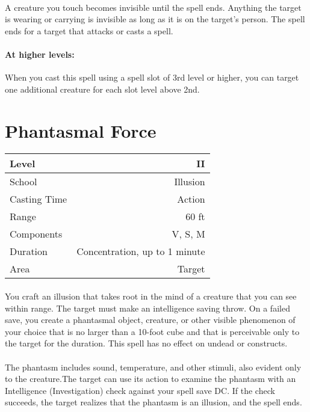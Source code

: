 \documentclass[a5paper,12pt]{article}
\begin{document}
\paragraph{}
A creature you touch becomes invisible until the spell ends. Anything the target is wearing or carrying is invisible as long as it is on the target's person. The spell ends for a target that attacks or casts a spell.

\paragraph{At higher levels:}
When you cast this spell using a spell slot of 3rd level or higher, you can target one additional creature for each slot level above 2nd.

\newpage

\section*{Phantasmal Force}
\begin{table}[h]
   \centering
   \begin{tabular}{|l|r|}
      \hline
      Level        & II \\
      \hline
      School       & Illusion \\
      \hline
      Casting Time & Action \\
      \hline
      Range        & 60 ft \\
      \hline
      Components   & V, S, M \\
      \hline
      Duration     & Concentration, up to 1 minute \\
      \hline
      Area         & Target \\
      \hline
   \end{tabular}
\end{table}

\footnotesize{}
\paragraph{}
You craft an illusion that takes root in the mind of a creature that you can see within range. The target must make an intelligence saving throw. On a failed save, you create a phantasmal object, creature, or other visible phenomenon of your choice that is no larger than a 10-foot cube and that is perceivable only to the target for the duration. This spell has no effect on undead or constructs.

\paragraph{}
The phantasm includes sound, temperature, and other stimuli, also evident only to the creature.The target can use its action to examine the phantasm with an Intelligence (Investigation) check against your spell save DC. If the check succeeds, the target realizes that the phantasm is an illusion, and the spell ends.
\end{document}
